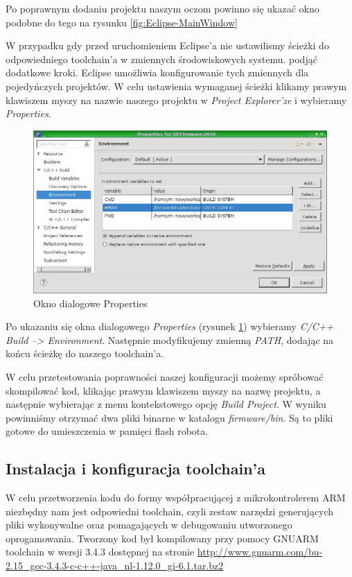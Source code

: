 Po poprawnym dodaniu projektu naszym oczom powinno się ukazać okno podobne do tego na rysunku \ref{fig:Eclipse-MainWindow}

W przypadku gdy przed uruchomieniem Eclipse'a nie ustawilismy ścieżki do odpowiedniego toolchain'a w zmiennych środowiskowych systemu. podjąć dodatkowe kroki. Eclipse umożliwia konfigurowanie tych zmiennych dla pojedyńczych projektów. W celu ustawienia wymaganej ścieżki klikamy prawym klawiszem myszy na nazwie naszego projektu w \textit{Project Explorer'ze} i wybieramy \textit{Properties}. 

\begin{figure}
 \centering
 \includegraphics[width=150.0mm]{../images/Eclipse-Project-Properties.jpg}
 \caption{Okno dialogowe Properties}
 \label{fig:Eclipse-Project-Properties}
\end{figure}

Po ukazaniu się okna dialogowego \textit{Properties} (rysunek \ref{fig:Eclipse-Project-Properties}) wybieramy \textit{C/C++ Build --> Environment}. Następnie modyfikujemy zmienną \textit{PATH}, dodając na końcu ścieżkę do naszego toolchain'a.

W celu przetestowania poprawności naszej konfiguracji możemy spróbować skompilować kod, klikając prawym klawiszem myszy na nazwę projektu, a następnie wybierając z menu kontekstowego opcję \textit{Build Project}. W wyniku powinniśmy otrzymać dwa pliki binarne w katalogu \textit{firmware/bin}. Są to pliki gotowe do umieszczenia w pamięci flash robota.

\subsection{Instalacja i konfiguracja toolchain'a}
W celu przetworzenia kodu do formy współpracującej z mikrokontrolerem ARM niezbędny nam jest odpowiedni toolchain, czyli zestaw narzędzi generujących pliki wykonywalne oraz pomagających w debugowaniu utworzonego oprogamowania. Tworzony kod był kompilowany przy pomocy GNUARM toolchain w wersji 3.4.3 dostępnej na stronie \url{http://www.gnuarm.com/bu-2.15_gcc-3.4.3-c-c++-java_nl-1.12.0_gi-6.1.tar.bz2}

